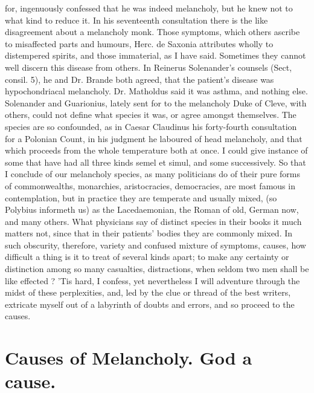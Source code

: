 {{for, ingenuously confessed that he was indeed melancholy, but he knew
not to what kind to reduce it. In his seventeenth consultation there is
the like disagreement about a melancholy monk. Those symptoms, which
others ascribe to misaffected parts and humours, Herc. de Saxonia
attributes wholly to distempered spirits, and those immaterial, as I
have said. Sometimes they cannot well discern this disease from others.
In Reinerus Solenander's counsels (Sect, consil. 5), he and Dr. Brande
both agreed, that the patient's disease was hypochondriacal melancholy.
Dr. Matholdus said it was asthma, and nothing else. Solenander
and Guarionius, lately sent for to the melancholy Duke of Cleve, with
others, could not define what species it was, or agree amongst
themselves. The species are so confounded, as in Caesar Claudinus his
forty-fourth consultation for a Polonian Count, in his judgment
he laboured of head melancholy, and that which proceeds from the
whole temperature both at once. I could give instance of some that have
had all three kinds semel et simul, and some successively. So that I
conclude of our melancholy species, as many politicians do of
their pure forms of commonwealths, monarchies, aristocracies,
democracies, are most famous in contemplation, but in practice they are
temperate and usually mixed, (so Polybius informeth us) as the
Lacedaemonian, the Roman of old, German now, and many others. What
physicians say of distinct species in their books it much matters not,
since that in their patients' bodies they are commonly mixed. In such
obscurity, therefore, variety and confused mixture of symptoms, causes,
how difficult a thing is it to treat of several kinds apart; to make
any certainty or distinction among so many casualties, distractions,
when seldom two men shall be like effected ? 'Tis hard, I
confess, yet nevertheless I will adventure through the midst of these
perplexities, and, led by the clue or thread of the best writers,
extricate myself out of a labyrinth of doubts and errors, and so
proceed to the causes.



\section{Causes of Melancholy. God a cause.}\label{sec:causes-of-melancholy}

}}
